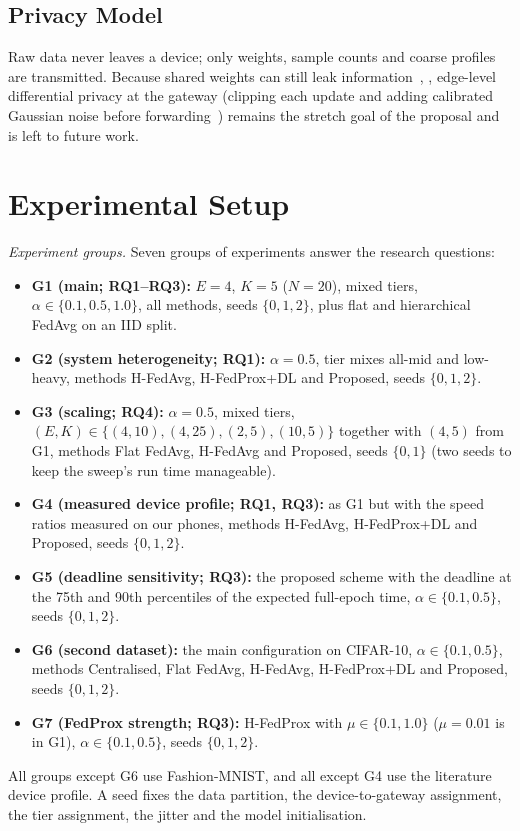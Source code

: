 \documentclass[conference]{IEEEtran}
\begin{document}
\subsection{Privacy Model}
Raw data never leaves a device; only weights, sample counts and coarse profiles are transmitted. Because shared weights can still leak information~\cite{zhao2024loki}, \cite{du2025sok}, edge-level differential privacy at the gateway (clipping each update and adding calibrated Gaussian noise before forwarding~\cite{mcmahan2018dp}) remains the stretch goal of the proposal and is left to future work.

\section{Experimental Setup}
\label{sec:setup}

\textit{Experiment groups.} Seven groups of experiments answer the research questions:
\begin{itemize}
\item \textbf{G1 (main; RQ1--RQ3):} $E = 4$, $K = 5$ ($N = 20$), mixed tiers, $\alpha \in \{0.1, 0.5, 1.0\}$, all methods, seeds $\{0, 1, 2\}$, plus flat and hierarchical FedAvg on an IID split.
\item \textbf{G2 (system heterogeneity; RQ1):} $\alpha = 0.5$, tier mixes all-mid and low-heavy, methods H-FedAvg, H-FedProx+DL and Proposed, seeds $\{0, 1, 2\}$.
\item \textbf{G3 (scaling; RQ4):} $\alpha = 0.5$, mixed tiers, $(E, K) \in \{(4,10), (4,25), (2,5), (10,5)\}$ together with $(4,5)$ from G1, methods Flat FedAvg, H-FedAvg and Proposed, seeds $\{0, 1\}$ (two seeds to keep the sweep's run time manageable).
\item \textbf{G4 (measured device profile; RQ1, RQ3):} as G1 but with the speed ratios measured on our phones, methods H-FedAvg, H-FedProx+DL and Proposed, seeds $\{0, 1, 2\}$.
\item \textbf{G5 (deadline sensitivity; RQ3):} the proposed scheme with the deadline at the 75th and 90th percentiles of the expected full-epoch time, $\alpha \in \{0.1, 0.5\}$, seeds $\{0, 1, 2\}$.
\item \textbf{G6 (second dataset):} the main configuration on CIFAR-10, $\alpha \in \{0.1, 0.5\}$, methods Centralised, Flat FedAvg, H-FedAvg, H-FedProx+DL and Proposed, seeds $\{0, 1, 2\}$.
\item \textbf{G7 (FedProx strength; RQ3):} H-FedProx with $\mu \in \{0.1, 1.0\}$ ($\mu = 0.01$ is in G1), $\alpha \in \{0.1, 0.5\}$, seeds $\{0, 1, 2\}$.
\end{itemize}
All groups except G6 use Fashion-MNIST, and all except G4 use the literature device profile.
A seed fixes the data partition, the device-to-gateway assignment, the tier assignment, the jitter and the model initialisation.
\end{document}
